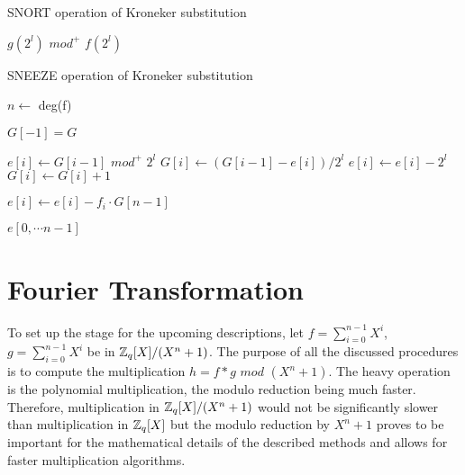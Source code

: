 \begin{algorithm}
    \caption{SNORT operation of Kroneker substitution}
    \label{alg:snort}
    \begin{algorithmic}[1]
    

        \Return $g(2^l)$ $mod^{+}$ $f(2^l)$
    
    \EndProcedure
    
    \end{algorithmic}
\end{algorithm}

\begin{algorithm}
    \caption{SNEEZE operation of Kroneker substitution}
    \label{alg:sneeze}
    \begin{algorithmic}[1]
    

        $n \leftarrow$ deg(f)

        $G[-1] = G$


            \State $e[i] \leftarrow G[i - 1]$ $mod^+$ $2^l$ 
            \State $G[i] \leftarrow (G[i - 1] - e[i]) / 2^l$ 
             
                \State $e[i] \leftarrow e[i] - 2^l$
                \State $G[i] \leftarrow G[i] + 1$
            \EndIf
        \EndFor

            \State $e[i] \leftarrow e[i] - f_i \cdot G[n - 1]$
        \EndFor

        \Return $e[0, \cdots n - 1]$
    
    \EndProcedure
    
    \end{algorithmic}
\end{algorithm}
 
\section{Fourier Transformation}

To set up the stage for the upcoming descriptions, let $f = \sum_{i=0}^{n - 1} X^i$, $g = \sum_{i=0}^{n - 1} X^i$ be in $\mathbb{Z}_q[X]/(X^n + 1)$. The purpose of all the discussed procedures is to compute the multiplication $h = f * g $ $mod$ $(X^n + 1)$. The heavy operation is the polynomial multiplication, the modulo reduction being much faster. Therefore, multiplication in $\mathbb{Z}_q[X]/(X^n + 1)$ would not be significantly slower than multiplication in $\mathbb{Z}_q[X]$ but the modulo reduction by  $X^n + 1$ proves to be important for the mathematical details of the described methods and allows for faster multiplication algorithms.

